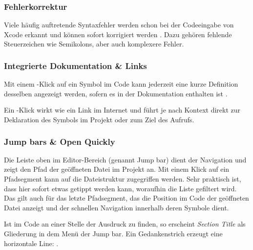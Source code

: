 \documentclass[parskip=half, final]{scrreprt}
\begin{document}

\subsubsection{Fehlerkorrektur}

Viele häufig auftretende Syntaxfehler werden schon bei der Codeeingabe von Xcode erkannt und können sofort korrigiert werden . Dazu gehören fehlende Steuerzeichen wie Semikolons, aber auch komplexere Fehler.


\subsubsection{Integrierte Dokumentation \& Links}\label{sec:quickdef}

Mit einem \keys{\altkey}-Klick auf ein Symbol im Code kann jederzeit eine kurze Definition desselben angezeigt werden, sofern es in der Dokumentation enthalten ist .


Ein \keys{\cmdkey}-Klick wirkt wie ein Link im Internet und führt je nach Kontext direkt zur Deklaration des Symbols im Projekt oder zum Ziel des Aufrufs.

\subsubsection{Jump bars \& Open Quickly}

Die Leiste oben im Editor-Bereich (genannt Jump bar) dient der Navigation und zeigt den Pfad der geöffneten Datei im Projekt an. Mit einem Klick auf ein Pfadsegment kann auf die Dateistruktur zugegriffen werden. Sehr praktisch ist, dass hier sofort etwas getippt werden kann, woraufhin die Liste gefiltert wird. Das gilt auch für das letzte Pfadsegment, das die Position im Code der geöffneten Datei anzeigt und der schnellen Navigation innerhalb deren Symbole dient.

 Ist im Code an einer Stelle der Ausdruck  zu finden, so erscheint \emph{Section Title} als Gliederung in dem Menü der Jump bar. Ein Gedankenstrich erzeugt eine horizontale Line: .
\end{document}
